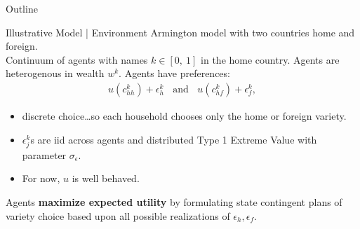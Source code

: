 \documentclass[9pt,pdftex,aspectratio=1610]{beamer}
\theoremstyle{definition}
\begin{document}

\begin{frame}[t]{Outline}
\smallskip
{}
\bigskip
{}
\end{frame}


\begin{frame}[t]{Illustrative Model | Environment}
\smallskip
Armington model with two countries home and foreign.\\
\medskip
Continuum of agents with names $k \in [0, \ 1]$ in the home country. Agents are heterogenous in wealth $w^k$.
Agents have preferences:
\begin{align*}
u(c_{hh}^k) + \epsilon_{h}^k  \ \ \ \  \mbox{and} \ \ \ \ u(c_{hf}^k) + \epsilon_{f}^k,
\end{align*}
\begin{itemize}
\item discrete choice\ldots so each household chooses only the home or foreign variety.
\smallskip
\item $\epsilon^k_{j}$s are iid across agents and distributed Type 1 Extreme Value with parameter $\sigma_{\epsilon}$.
\smallskip
\item For now, $u$ is well behaved.
\end{itemize}
\medskip
Agents \textbf{maximize expected utility} by formulating state contingent plans of variety choice based upon all possible realizations of $\epsilon_h, \epsilon_f$.
\end{frame}
\end{document}
